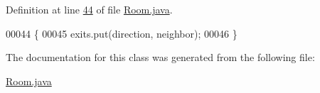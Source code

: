 Definition at line \hyperlink{Room_8java_source_l00044}{44} of file \hyperlink{Room_8java_source}{Room.\-java}.


\begin{DoxyCode}
00044                                                          \{
00045         exits.put(direction, neighbor);
00046     \}
\end{DoxyCode}


The documentation for this class was generated from the following file\-:\begin{DoxyCompactItemize}
\item 
\hyperlink{Room_8java}{Room.\-java}\end{DoxyCompactItemize}
